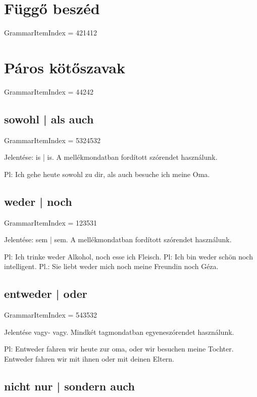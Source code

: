 \documentclass{article}
\newenvironment{desc}{\verbatim}{\endverbatim}
\begin{document}
\section{Függő beszéd}

GrammarItemIndex = 421412

\section{Páros kötőszavak}

GrammarItemIndex = 44242

\subsection{sowohl | als auch}

GrammarItemIndex = 5324532

\begin{desc}
Jelentése: is | is. A mellékmondatban fordított szórendet használunk.

Pl: Ich gehe heute sowohl zu dir, als auch besuche ich meine Oma. 
\end{desc}

\subsection{weder | noch}

GrammarItemIndex = 123531

\begin{desc}
Jelentése: sem | sem. A mellékmondatban fordított szórendet használunk.

Pl: Ich trinke weder Alkohol, noch esse ich Fleisch.
Pl: Ich bin weder schön noch intelligent.
Pl.: Sie liebt weder mich noch meine Freundin noch Géza.
\end{desc}

\subsection{entweder | oder}

GrammarItemIndex = 543532

\begin{desc}
Jelentése vagy- vagy. Mindkét tagmondatban egyeneszórendet használunk.

Pl: Entweder fahren wir heute zur oma, oder wir besuchen meine Tochter.
Entweder fahren wir mit ihnen oder mit deinen Eltern.
\end{desc}

\subsection{nicht nur | sondern auch}
\end{document}
